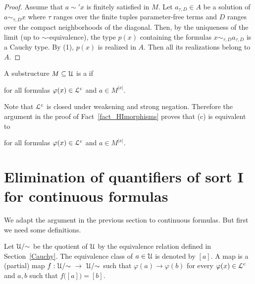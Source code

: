 \documentclass[10pt,oneside]{amsproc}
\renewcommand*{\emph}[1]{%
   \smash{\tikz[baseline]\node[rectangle, fill=teal!25, rounded corners, inner xsep=0.5ex, inner ysep=0.2ex, anchor=base, minimum height = 2.7ex]{\strut #1};}}
\begin{document}
{\begin{proof}
  Assume that $a\sim'x$ is finitely satisfied in $M$. 
  Let $a_{\tau,D}\in A$ be a solution of $a\sim_{\tau,D}x$ where $\tau$ ranges over the finite tuples parameter-free terms and $D$ ranges over the compact neighborhoods of the diagonal.
  Then, by the uniqueness of the limit (up to $\sim$-equivalence), the type $p(x)$ containing the formulas $x\sim_{\tau,D}a_{\tau,D}$ is a Cauchy type.
  By (1), $p(x)$ is realized in $A$.
  Then all its realizations belong to $A$.
\end{proof}

A substructure $M\subseteq{\EuScript U}$ is a \emph{c-model\/} if 

\hfill
for all formulas $\varphi(x)\in{\EuScript L}^{\rm c}$ and $a\in M^{|x|}$.

Note that ${\EuScript L}^{\rm c}$ is closed under weakening and strong negation.
Therefore the argument in the proof of Fact~\ref{fact_HImorphisms} proves that (c) is equivalent to

\hfill
for all formulas $\varphi(x)\in{\EuScript L}^{\rm c}$ and $a\in M^{|x|}$.





\section{Elimination of quantifiers of sort \textsf{I} for continuous formulas}\label{IeliminationC}

We adapt the argument in the previous section to continuous formulas.
But first we need some definitions.

Let ${\EuScript U}/{\sim}$ be the quotient of ${\EuScript U}$ by the equivalence relation defined in Section~\ref{Cauchy}.
The equivalence class of $a\in{\EuScript U}$ is denoted by $[a]$.
A \emph{c-elementary\/} map is a (partial) map $f:{\EuScript U}/{\sim}\ \to\ {\EuScript U}/{\sim}$ such that $\varphi(a)\rightarrow\varphi(b)$ for every $\varphi(x)\in{\EuScript L}^{\rm c}$ and $a,b$ such that $f\big([a]\big)=[b]$.

}
\end{document}
